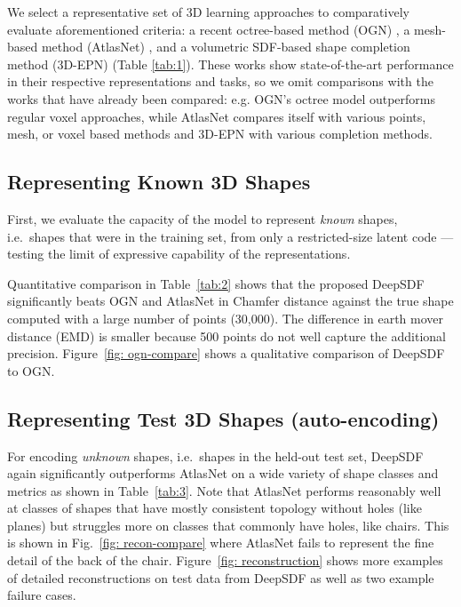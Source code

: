 \documentclass[10pt,twocolumn,letterpaper]{article}
\begin{document}
We select a representative set of 3D learning approaches to comparatively evaluate aforementioned criteria: a recent octree-based method (OGN) \cite{ogn2017}, a mesh-based method (AtlasNet) \cite{groueix2018atlasnet}, and a volumetric SDF-based shape completion method (3D-EPN) \cite{dai2017shape} (Table \ref{tab:1}). These works show state-of-the-art performance in their respective representations and tasks, so we omit comparisons with the  works that have already been compared: e.g. OGN's octree model outperforms regular voxel approaches, while AtlasNet compares itself with various points, mesh, or voxel based methods and 3D-EPN with various completion methods.




\subsection{Representing Known 3D  Shapes} \label{sec:representing}

First, we evaluate the capacity of the model to represent \textit{known} shapes, i.e.~shapes that were in the training set, from only a restricted-size latent code --- testing the limit of expressive capability of the representations. 
%

Quantitative comparison in Table~\ref{tab:2} shows that the proposed DeepSDF significantly beats OGN and AtlasNet in Chamfer distance against the true shape computed with a large number of points (30,000). The difference in earth mover distance (EMD) is smaller because 500 points do not well capture the additional precision. Figure~\ref{fig: ogn-compare} shows a qualitative comparison of DeepSDF to OGN.

\subsection{Representing Test 3D Shapes (auto-encoding)}

For encoding \textit{unknown} shapes, i.e.~shapes in the held-out test set, DeepSDF again significantly outperforms AtlasNet on a wide variety of shape classes and metrics as shown in Table~\ref{tab:3}. Note that AtlasNet performs reasonably well at classes of shapes that have mostly consistent topology without holes (like planes) but struggles more on classes that commonly have holes, like chairs. This is shown in Fig.~\ref{fig: recon-compare} where AtlasNet fails to represent the fine detail of the back of the chair. Figure~\ref{fig: reconstruction} shows more examples of detailed reconstructions on test data from DeepSDF as well as two example failure cases. 
\end{document}
